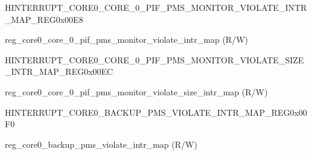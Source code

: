 \begin{register}{H}{INTERRUPT\_CORE0\_CORE\_0\_PIF\_PMS\_MONITOR\_VIOLATE\_INTR\_MAP\_REG}{0x00E8}\label{regdesc:INTERRUPTCORE0CORE0PIFPMSMONITORVIOLATEINTRMAPREG}
%
%
\regnewline%
\begin{regdesc}\begin{reglist}
\label{fielddesc:INTERRUPTCORE0CORE0PIFPMSMONITORVIOLATEINTRMAP}\item [INTERRUPT\_CORE0\_CORE\_0\_PIF\_PMS\_MONITOR\_VIOLATE\_INTR\_MAP] reg\_core0\_core\_0\_pif\_pms\_monitor\_violate\_intr\_map (R/W)
\end{reglist}\end{regdesc}
\end{register}


\begin{register}{H}{INTERRUPT\_CORE0\_CORE\_0\_PIF\_PMS\_MONITOR\_VIOLATE\_SIZE\_INTR\_MAP\_REG}{0x00EC}\label{regdesc:INTERRUPTCORE0CORE0PIFPMSMONITORVIOLATESIZEINTRMAPREG}
%
%
\regnewline%
\begin{regdesc}\begin{reglist}
\label{fielddesc:INTERRUPTCORE0CORE0PIFPMSMONITORVIOLATESIZEINTRMAP}\item [INTERRUPT\_CORE0\_CORE\_0\_PIF\_PMS\_MONITOR\_VIOLATE\_SIZE\_INTR\_MAP] reg\_core0\_core\_0\_pif\_pms\_monitor\_violate\_size\_intr\_map (R/W)
\end{reglist}\end{regdesc}
\end{register}


\begin{register}{H}{INTERRUPT\_CORE0\_BACKUP\_PMS\_VIOLATE\_INTR\_MAP\_REG}{0x00F0}\label{regdesc:INTERRUPTCORE0BACKUPPMSVIOLATEINTRMAPREG}
%
%
\regnewline%
\begin{regdesc}\begin{reglist}
\label{fielddesc:INTERRUPTCORE0BACKUPPMSVIOLATEINTRMAP}\item [INTERRUPT\_CORE0\_BACKUP\_PMS\_VIOLATE\_INTR\_MAP] reg\_core0\_backup\_pms\_violate\_intr\_map (R/W)
\end{reglist}\end{regdesc}
\end{register}



